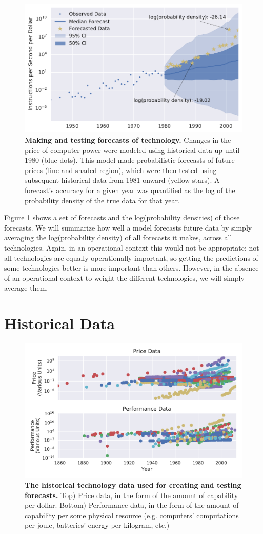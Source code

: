 \documentclass{article}
\begin{document}
\begin{figure}
    \centering
    \includegraphics[width=.75\textwidth]{figs/forecast_evaluation.pdf}
    \caption{\textbf{Making and testing forecasts of technology.} Changes in the price of computer power were modeled using historical data up until 1980 (blue dots). This model made probabilistic forecasts of future prices (line and shaded region), which were then tested using subsequent historical data from 1981 onward (yellow stars). A forecast's accuracy for a given year was quantified as the log of the probability density of the true data for that year.}
    \label{fig:forecast_evaluation}
\end{figure}

Figure \ref{fig:forecast_evaluation} shows a set of forecasts and the log(probability densities) of those forecasts. We will summarize how well a model forecasts future data by simply averaging the log(probability density) of all forecasts it makes, across all technologies. Again, in an operational context this would not be appropriate; not all technologies are equally operationally important, so getting the predictions of some technologies better is more important than others. However, in the absence of an operational context to weight the different technologies, we will simply average them.

\section{Historical Data}
\begin{figure}
    \centering
    \includegraphics[width=.75\textwidth]{figs/Historical_Technology_Data.pdf}
    \caption{\textbf{The historical technology data used for creating and testing forecasts.} Top) Price data, in the form of the amount of capability per dollar. Bottom) Performance data, in the form of the amount of capability per some physical resource (e.g. computers' computations per joule, batteries' energy per kilogram, etc.)}
    \label{fig:Historical_Technology_Data}
\end{figure}
\end{document}
